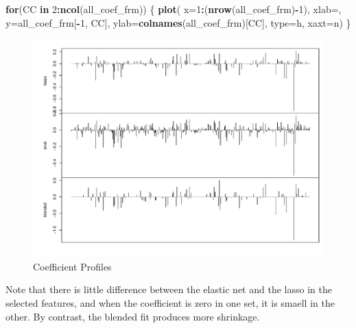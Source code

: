 \documentclass[
]{book}
\newenvironment{Shaded}{\begin{snugshade}}{\end{snugshade}}
\newcommand{\ControlFlowTok}[1]{\textcolor[rgb]{0.13,0.29,0.53}{\textbf{#1}}}
\newcommand{\DataTypeTok}[1]{\textcolor[rgb]{0.13,0.29,0.53}{#1}}
\newcommand{\DecValTok}[1]{\textcolor[rgb]{0.00,0.00,0.81}{#1}}
\newcommand{\KeywordTok}[1]{\textcolor[rgb]{0.13,0.29,0.53}{\textbf{#1}}}
\newcommand{\NormalTok}[1]{#1}
\newcommand{\OperatorTok}[1]{\textcolor[rgb]{0.81,0.36,0.00}{\textbf{#1}}}
\newcommand{\StringTok}[1]{\textcolor[rgb]{0.31,0.60,0.02}{#1}}
\begin{document}
\begin{Shaded}
\begin{Highlighting}[]
\ControlFlowTok{for}\NormalTok{(CC }\ControlFlowTok{in} \DecValTok{2}\OperatorTok{:}\KeywordTok{ncol}\NormalTok{(all\_coef\_frm)) \{}
 \KeywordTok{plot}\NormalTok{(}
  \DataTypeTok{x=}\DecValTok{1}\OperatorTok{:}\NormalTok{(}\KeywordTok{nrow}\NormalTok{(all\_coef\_frm)}\OperatorTok{{-}}\DecValTok{1}\NormalTok{), }\DataTypeTok{xlab=}\StringTok{\textquotesingle{}\textquotesingle{}}\NormalTok{, }
  \DataTypeTok{y=}\NormalTok{all\_coef\_frm[}\OperatorTok{{-}}\DecValTok{1}\NormalTok{, CC], }\DataTypeTok{ylab=}\KeywordTok{colnames}\NormalTok{(all\_coef\_frm)[CC],}
  \DataTypeTok{type=}\StringTok{\textquotesingle{}h\textquotesingle{}}\NormalTok{, }\DataTypeTok{xaxt=}\StringTok{\textquotesingle{}n\textquotesingle{}}\NormalTok{)}
\NormalTok{\}}
\end{Highlighting}
\end{Shaded}

\begin{figure}
\centering
\includegraphics{Static/figures/brcaRna-glmnetFit-compCoeffProf-1.pdf}
\caption{\label{fig:brcaRna-glmnetFit-compCoeffProf}Coefficient Profiles}
\end{figure}

Note that there is little difference between the elastic net and the lasso
in the selected features, and when the coefficient is zero in one set, it
is smaell in the other. By contrast, the blended fit produces more shrinkage.
\end{document}
